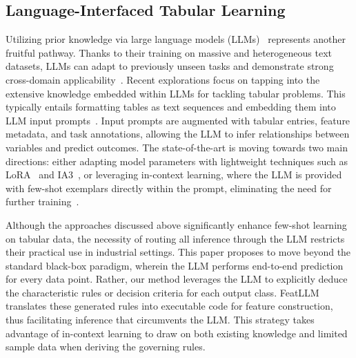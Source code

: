 \subsection{Language-Interfaced Tabular Learning} Utilizing prior knowledge via large language models (LLMs)~\cite{anil2023palm,openai2023gpt4} represents another fruitful pathway. Thanks to their training on massive and heterogeneous text datasets, LLMs can adapt to previously unseen tasks and demonstrate strong cross-domain applicability~\cite{brown2020language}. Recent explorations focus on tapping into the extensive knowledge embedded within LLMs for tackling tabular problems. This typically entails formatting tables as text sequences and embedding them into LLM input prompts~\cite{dinh2022lift,hegselmann2023tabllm,wang2023anypredict}. Input prompts are augmented with tabular entries, feature metadata, and task annotations, allowing the LLM to infer relationships between variables and predict outcomes. The state-of-the-art is moving towards two main directions: either adapting model parameters with lightweight techniques such as LoRA~\cite{hu2021lora} and IA3~\cite{liu2022few}, or leveraging in-context learning, where the LLM is provided with few-shot exemplars directly within the prompt, eliminating the need for further training~\cite{dinh2022lift,hegselmann2023tabllm,nam2023semi,slack2023tablet}.

Although the approaches discussed above significantly enhance few-shot learning on tabular data, the necessity of routing all inference through the LLM restricts their practical use in industrial settings. This paper proposes to move beyond the standard black-box paradigm, wherein the LLM performs end-to-end prediction for every data point. Rather, our method leverages the LLM to explicitly deduce the characteristic rules or decision criteria for each output class. \textsf{FeatLLM} translates these generated rules into executable code for feature construction, thus facilitating inference that circumvents the LLM. This strategy takes advantage of in-context learning to draw on both existing knowledge and limited sample data when deriving the governing rules.

